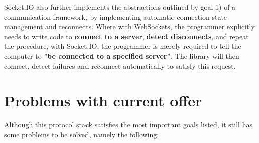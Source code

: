 \documentclass[conference]{IEEEtran}
\begin{document}
Socket.IO also further implements the abstractions outlined by goal 1) of a communication framework, by implementing automatic connection state management and reconnects. Where with WebSockets, the programmer explicitly needs to write code to \textbf{connect to a server},  \textbf{detect disconnects}, and repeat the procedure, with Socket.IO, the programmer is merely required to tell the computer to \textbf{"be connected to a specified server"}. The library will then connect, detect failures and reconnect automatically to satisfy this request.


\section{Problems with current offer}

Although this protocol stack satisfies the most important goals listed, it still has some problems to be solved, namely the following:
\end{document}

